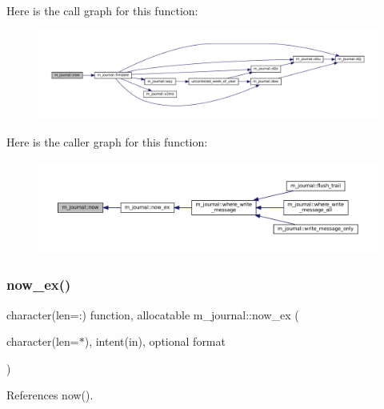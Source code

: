 Here is the call graph for this function\+:\nopagebreak
\begin{figure}[H]
\begin{center}
\leavevmode
\includegraphics[width=350pt]{namespacem__journal_a4a421ecf44cfb86feeee17c7505d7b98_cgraph}
\end{center}
\end{figure}
Here is the caller graph for this function\+:\nopagebreak
\begin{figure}[H]
\begin{center}
\leavevmode
\includegraphics[width=350pt]{namespacem__journal_a4a421ecf44cfb86feeee17c7505d7b98_icgraph}
\end{center}
\end{figure}
\mbox{\label{namespacem__journal_a9c8074667748f2685122f2b3147e61d5}} 
\subsubsection{\texorpdfstring{now\+\_\+ex()}{now\_ex()}}
{\footnotesize\ttfamily character(len=\+:) function, allocatable m\+\_\+journal\+::now\+\_\+ex (\begin{DoxyParamCaption}\item[{character(len=$\ast$), intent(in), optional}]{format }\end{DoxyParamCaption})\hspace{0.3cm}{\ttfamily [private]}}



References now().

